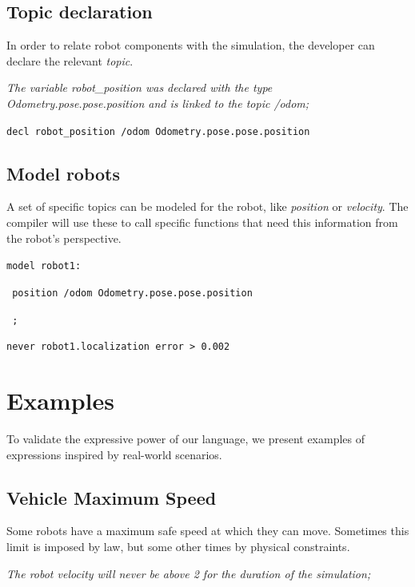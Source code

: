 \documentclass[runningheads]{llncs}
\begin{document}
\subsection{Topic declaration}

In order to relate robot components with the simulation, the developer can declare the relevant \textit{topic}.

\textit{The variable robot\_position was declared with the type Odometry.pose.pose.position and is linked to the topic /odom;}

\vspace{2mm}

\texttt{decl robot\_position /odom Odometry.pose.pose.position}


\subsection{Model robots}

A set of specific topics can be modeled for the robot, like \textit{position} or \textit{velocity}. The compiler will use these to call specific functions that need this information from the robot's perspective.

\vspace{2mm}

\texttt{model robot1:}

\texttt{    position /odom Odometry.pose.pose.position}

\texttt{    ;}

\vspace{2mm}

\texttt{never robot1.localization error > 0.002}


\section{Examples}

To validate the expressive power of our language, we present examples of expressions inspired by real-world scenarios.


\subsection{Vehicle Maximum Speed}

Some robots have a maximum safe speed at which they can move. Sometimes this limit is imposed by law, but some other times by physical constraints.


\textit{The robot velocity will never be above 2 for the duration of the simulation;}
\end{document}
